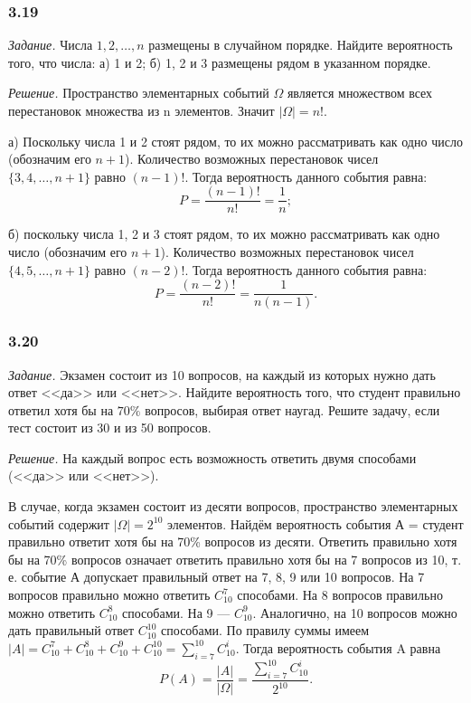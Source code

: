 \documentclass{book}
\begin{document}
\subsubsection*{3.19}

\textit{Задание.} Числа $ 1, 2,  \dotsc , n $ размещены в случайном порядке.
Найдите вероятность того, что числа:
а) 1 и 2;
б) 1, 2 и 3 размещены рядом в указанном порядке.

\textit{Решение.} Пространство элементарных событий $  \Omega$ является множеством всех перестановок множества из n элементов.
Значит $ |\Omega| = n! $.

а) Поскольку числа 1 и 2 стоят рядом, то их можно рассматривать как одно число (обозначим его $ n + 1 $).
Количество возможных перестановок чисел $ \{ 3, 4,  \dotsc , n + 1 \} $ равно $ \left( n - 1 \right)! $.
Тогда вероятность данного события равна:
$$ P =
\frac{ \left( n - 1 \right)! }{ n! } =
\frac{1}{n};$$

б) поскольку числа 1, 2 и 3 стоят рядом, то их можно рассматривать как одно число (обозначим его $ n + 1 $).
Количество возможных перестановок чисел $ \{ 4, 5,  \dotsc , n + 1 \} $ равно $ \left( n - 2 \right)! $.
Тогда вероятность данного события равна:
$$ P = \frac{ \left( n - 2 \right)!}{ n! } =
\frac{1}{ n (n - 1 ) }.$$

\subsubsection*{3.20}

\textit{Задание.} Экзамен состоит из 10 вопросов, на каждый из которых нужно дать ответ <<да>> или <<нет>>.
Найдите вероятность того, что студент правильно ответил хотя бы на $ 70 \% $ вопросов, выбирая ответ наугад.
Решите задачу, если тест состоит из 30 и из 50 вопросов.

\textit{Решение.} На каждый вопрос есть возможность ответить двумя способами (<<да>> или <<нет>>).

В случае, когда экзамен состоит из десяти вопросов, пространство элементарных событий содержит $ | \Omega | = 2^{10} $ элементов.
Найдём вероятность события А = {студент правильно ответит хотя бы на 70\% вопросов из десяти}.
Ответить правильно хотя бы на 70\% вопросов означает ответить правильно хотя бы на 7 вопросов из 10, т. е. событие А допускает правильный ответ на 7, 8, 9 или 10 вопросов.
На 7 вопросов правильно можно ответить $ C_{10}^7 $ способами.
На 8 вопросов правильно можно ответить $ C_{10}^8 $ способами.
На 9 --- $ C_{10}^9 $.
Аналогично, на 10 вопросов можно дать правильный ответ $ C_{10}^{10} $ способами.
По правилу суммы имеем $ |A| = C_{10}^7 + C_{10}^8 + C_{10}^9 + C_{10}^{10} = \sum \limits_{i=7}^{10} C_{10}^i $.
Тогда вероятность события A равна
$$ P \left( A \right) =
\frac{|A|}{| \Omega |} =
\frac{ \sum \limits_{i=7}^{10} C_{10}^i}{2^{10}}.$$
\end{document}

